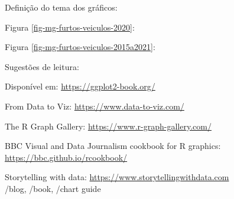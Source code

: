\begin{frame}
\framebreak
Definição do tema dos gráficos:


\framebreak
Figura \ref{fig-mg-furtos-veiculos-2020}:


\framebreak
Figura \ref{fig-mg-furtos-veiculos-2015a2021}:


\end{frame}




\begin{frame}
Sugestões de leitura: 
\vspace{2ex}

Disponível em: \url{https://ggplot2-book.org/}

\vspace{3ex}

\vspace{3ex}
From Data to Viz: \url{https://www.data-to-viz.com/}

\vspace{3ex}
The R Graph Gallery: \url{https://www.r-graph-gallery.com/}

\vspace{3ex}
BBC Visual and Data Journalism cookbook for R graphics: \url{https://bbc.github.io/rcookbook/}

\vspace{3ex}
Storytelling with data: \url{https://www.storytellingwithdata.com}\\
/blog, /book, /chart guide

\end{frame}
